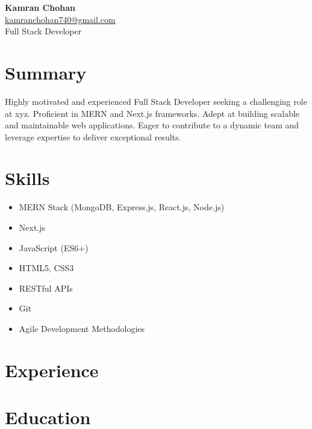 \documentclass[11pt,a4paper]{article}
\begin{document}
\begin{center}
    {\Large \textbf{Kamran Chohan}} \\
    \href{mailto:kamranchohan740@gmail.com}{kamranchohan740@gmail.com} \\
    Full Stack Developer
\end{center}

\vspace{0.5cm}

\section{Summary}
Highly motivated and experienced Full Stack Developer seeking a challenging role at xyz.  Proficient in MERN and Next.js frameworks.  Adept at building scalable and maintainable web applications. Eager to contribute to a dynamic team and leverage expertise to deliver exceptional results.


\section{Skills}
\begin{itemize}[nosep, leftmargin=*]
    \item MERN Stack (MongoDB, Express.js, React.js, Node.js)
    \item Next.js
    \item JavaScript (ES6+)
    \item HTML5, CSS3
    \item RESTful APIs
    \item Git
    \item Agile Development Methodologies
\end{itemize}


\section{Experience}

\section{Education}
\end{document}

